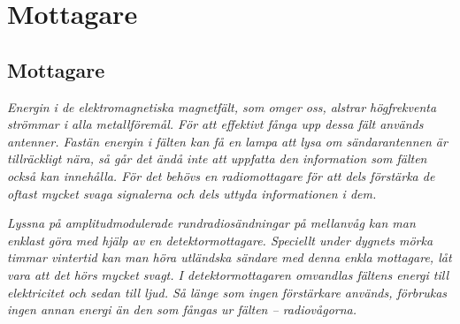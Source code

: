 \chapter{Mottagare}

\begin{multicols}{2}

\section{Mottagare}
\label{mottagare}

\emph{Energin i de elektromagnetiska magnetfält, som omger oss,
  alstrar högfrekventa strömmar i alla metallföremål.
  För att effektivt fånga upp dessa fält används antenner.
  Fastän energin i fälten kan få en lampa att lysa om sändarantennen
  är tillräckligt nära, så går det ändå inte att uppfatta den information
  som fälten också kan innehålla.
  För det behövs en radiomottagare för att dels förstärka de oftast mycket
  svaga signalerna och dels uttyda informationen i dem.}

\emph{Lyssna på amplitudmodulerade rundradiosändningar på mellanvåg
  kan man enklast göra med hjälp av en detektormottagare.
  Speciellt under dygnets mörka timmar vintertid kan man höra utländska sändare
  med denna enkla mottagare, låt vara att det hörs mycket svagt.
  I detektormottagaren omvandlas fältens energi till elektricitet och
  sedan till ljud.
  Så länge som ingen förstärkare används, förbrukas ingen annan energi än
  den som fångas ur fälten -- radiovågorna.}

\end{multicols}
